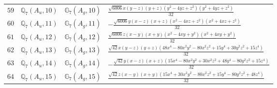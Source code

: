 \documentclass[fleqn,8pt,landscape]{jsarticle}
\begin{document}
\begin{table}[ht!]
\begin{center}
\begin{tabular}{cccl}
$ 59 $ & $ \mathbb{Q}_{7}(A_{u},10) $ & $ \mathbb{G}_{7}(A_{g},10) $ & $ \frac{\sqrt{6006} x \left(y - z\right) \left(y + z\right) \left(y^{2} - 4 y z + z^{2}\right) \left(y^{2} + 4 y z + z^{2}\right)}{32} $ \\
$ 60 $ & $ \mathbb{Q}_{7}(A_{u},11) $ & $ \mathbb{G}_{7}(A_{g},11) $ & $ - \frac{\sqrt{6006} y \left(x - z\right) \left(x + z\right) \left(x^{2} - 4 x z + z^{2}\right) \left(x^{2} + 4 x z + z^{2}\right)}{32} $ \\
$ 61 $ & $ \mathbb{Q}_{7}(A_{u},12) $ & $ \mathbb{G}_{7}(A_{g},12) $ & $ \frac{\sqrt{6006} z \left(x - y\right) \left(x + y\right) \left(x^{2} - 4 x y + y^{2}\right) \left(x^{2} + 4 x y + y^{2}\right)}{32} $ \\
$ 62 $ & $ \mathbb{Q}_{7}(A_{u},13) $ & $ \mathbb{G}_{7}(A_{g},13) $ & $ \frac{\sqrt{42} x \left(y - z\right) \left(y + z\right) \left(48 x^{4} - 80 x^{2} y^{2} - 80 x^{2} z^{2} + 15 y^{4} + 30 y^{2} z^{2} + 15 z^{4}\right)}{32} $ \\
$ 63 $ & $ \mathbb{Q}_{7}(A_{u},14) $ & $ \mathbb{G}_{7}(A_{g},14) $ & $ - \frac{\sqrt{42} y \left(x - z\right) \left(x + z\right) \left(15 x^{4} - 80 x^{2} y^{2} + 30 x^{2} z^{2} + 48 y^{4} - 80 y^{2} z^{2} + 15 z^{4}\right)}{32} $ \\
$ 64 $ & $ \mathbb{Q}_{7}(A_{u},15) $ & $ \mathbb{G}_{7}(A_{g},15) $ & $ \frac{\sqrt{42} z \left(x - y\right) \left(x + y\right) \left(15 x^{4} + 30 x^{2} y^{2} - 80 x^{2} z^{2} + 15 y^{4} - 80 y^{2} z^{2} + 48 z^{4}\right)}{32} $ \\
 \hline \hline
\end{tabular}
\end{center}
\end{table}
\end{document}
